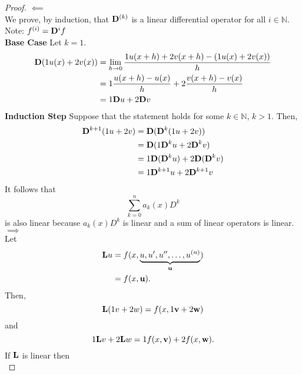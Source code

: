 \begin{proof}\(\impliedby\)\\
	We prove, by induction, that \(\mathrm{\bf{D}}^{(k)}\) is a linear differential operator for all \(i \in \mathbb{N}\). Note: \(f^{(i)}=\mathrm{\bf{D}}^{i}f\)\\
	\textbf{Base Case} Let \(k=1\).\\
	\begin{equation*}
		\begin{split}
			\mathrm{\bf{D}} (1 u(x) + 2 v(x)) &= \lim_{h\to 0} \frac{1 u(x+h) + 2 v(x+h)-(1 u(x) + 2 v(x))}{h}\\
			&=1 \frac{u(x+h) - u(x)}{h} + 2 \frac{v(x+h)-v(x)}{h}\\
			&= 1 \mathrm{\bf{D}} u + 2 \mathrm{\bf{D}} v
		\end{split}
	\end{equation*}
	\textbf{Induction Step} Suppose that the statement holds for some \(k\in\mathbb{N}\), \(k>1\). Then,
	\begin{equation*}
		\begin{split}
			\mathrm{\bf{D}}^{k+1} (1 u + 2 v) &= \mathrm{\bf{D}} ( \mathrm{\bf{D}}^{k}(1 u + 2 v))\\
			&=\mathrm{\bf{D}}(1 \mathrm{\bf{D}}^{k} u + 2 \mathrm{\bf{D}}^{k} v)\\
			&=1 \mathrm{\bf{D}}(\mathrm{\bf{D}}^{k} u) + 2 \mathrm{\bf{D}} (\mathrm{\bf{D}}^{k} v)\\
			&= 1 \mathrm{\bf{D}}^{k+1} u + 2 \mathrm{\bf{D}}^{k+1} v
		\end{split}
	\end{equation*}
	It follows that 
	\begin{equation*}
		\sum_{k=0}^{n} a_k(x) D^{k}
	\end{equation*}
	is also linear because \(a_k(x) D^{k}\) is linear and a sum of linear operators is linear.\\
	\(\implies\)\\
	Let
	\begin{equation*}
		\begin{split}
			\mathrm{\bf{L}} u &= f(x, \underbrace{u, u', u'', \dots, u^{(n)}}_{\textbf{u}})\\
			&=f(x, \textbf{u}).
		\end{split}
	\end{equation*}
	Then,
	\begin{equation*}
		\mathrm{\bf{L}} (1 v + 2 w) = f(x, 1 \textbf{v} + 2 \textbf{w})
	\end{equation*}
	and
	\begin{equation*}
		1 \mathrm{\bf{L}} v + 2 \mathrm{\bf{L}} w = 1 f(x,\textbf{v}) + 2 f(x,\textbf{w}).
	\end{equation*}
	If \(\mathrm{\bf{L}}\) is linear then 
	\begin{equation*}

\end{equation*}
\end{proof}
